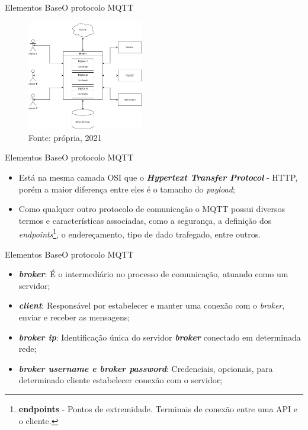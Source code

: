\begin{frame}{Elementos Base}{O protocolo MQTT}

    \begin{figure}[H]
        \centering
        \caption{Diagrama básico MQTT}
        \includegraphics[width=0.45\textwidth]{figuras/mqtt.drawio.png}
        \caption*{\tiny{Fonte: própria, 2021}}
        \label{fig:mqtt_diagram}
    \end{figure}

\end{frame}

\begin{frame}{Elementos Base}{O protocolo MQTT}
    \begin{itemize}
        \item Está na mesma camada OSI que o \textbf{\textit{Hypertext Transfer Protocol}} - HTTP, porém a maior diferença entre eles é o tamanho do \textit{payload};
        \item Como qualquer outro protocolo de comunicação o MQTT possui diversos termos e características associadas, como a segurança, a definição dos \textit{endpoints}\footnote{\textbf{endpoints} - Pontos de extremidade. Terminais de conexão entre uma API e o cliente.}, o endereçamento, tipo de dado trafegado, entre outros.
    \end{itemize}

\end{frame}

\begin{frame}{Elementos Base}{O protocolo MQTT}
    \begin{itemize}
        \item \textbf{\textit{broker}}: É o intermediário no processo de comunicação, atuando como um servidor;
        \item \textbf{\textit{client}}: Responsável por estabelecer e manter uma conexão com o \textit{broker}, enviar e receber as mensagens;
        \item \textit{\textbf{broker ip}}: Identificação única do servidor \textit{\textbf{broker}} conectado em determinada rede;
        \item \textbf{\textit{broker username e broker password}}: Credenciais, opcionais, para determinado cliente estabelecer conexão com o servidor; 
    \end{itemize}

\end{frame}

